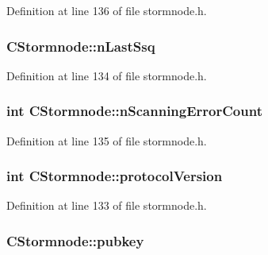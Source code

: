 Definition at line 136 of file stormnode.\+h.

\hypertarget{class_c_stormnode_ac74bbfb73c657430dba45308a6f7a013}{}
\subsubsection[{n\+Last\+Ssq}]{ C\+Stormnode\+::n\+Last\+Ssq}\label{class_c_stormnode_ac74bbfb73c657430dba45308a6f7a013}


Definition at line 134 of file stormnode.\+h.

\hypertarget{class_c_stormnode_a2f9e003508853f529c9ef70babe35fc0}{}
\subsubsection[{n\+Scanning\+Error\+Count}]{\setlength{\rightskip}{0pt plus 5cm}int C\+Stormnode\+::n\+Scanning\+Error\+Count}\label{class_c_stormnode_a2f9e003508853f529c9ef70babe35fc0}


Definition at line 135 of file stormnode.\+h.

\hypertarget{class_c_stormnode_aa2baa2da552179c9812730d4d9709502}{}
\subsubsection[{protocol\+Version}]{\setlength{\rightskip}{0pt plus 5cm}int C\+Stormnode\+::protocol\+Version}\label{class_c_stormnode_aa2baa2da552179c9812730d4d9709502}


Definition at line 133 of file stormnode.\+h.

\hypertarget{class_c_stormnode_af241ab789726de5ba5d2caba082c3d01}{}
\subsubsection[{pubkey}]{ C\+Stormnode\+::pubkey}\label{class_c_stormnode_af241ab789726de5ba5d2caba082c3d01}


